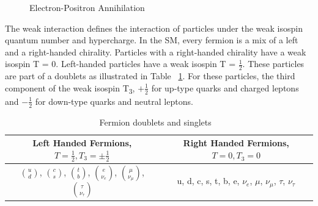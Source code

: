 \begin{figure}[h]
\begin{center}
\caption[Electron-Positron Annihilation]{Electron-Positron Annihilation}
\label{Fey:e-p}
\end{center}
\end{figure}

\indent The weak interaction defines the interaction of particles under the weak isospin quantum number and hypercharge. In the SM, every fermion is a mix of a left and a right-handed chirality. Particles with a right-handed chirality have a weak isospin T = 0. Left-handed particles have a weak isospin T =  ${\frac{1}{2}}$. These particles are part of a doublets as illustrated in Table ~\ref{tab:chiral}. For these particles, the third component of the weak isospin T\textsubscript{3}, ${+\frac{1}{2}}$ for up-type quarks and charged leptons and ${-\frac{1}{2}}$ for down-type quarks and neutral leptons.\newline %

\begin{table}[h]
\begin{center}
\def\arraystretch{1.5}
\begin{tabular}[h]{|c|c|}
\hline
Left Handed Fermions, ${T = \frac{1}{2}, T_{3} = \pm\frac{1}{2}}$ & Right Handed Fermions, ${T = 0, T_{3} = 0}$\\
\hline\hline
${\binom{u}{d}}$, ${\binom{c}{s}}$, ${\binom{t}{b}}$, ${\binom{e}{\nu_{e}}}$, ${\binom{\mu}{\nu_{\mu}}}$, ${\binom{\tau}{\nu_{\tau}}}$ & u, d, c, s, t, b, e, ${\nu_{e}}$, ${\mu}$, ${\nu_{\mu}}$, ${\tau}$, ${\nu_{\tau}}$ \\
\hline
\end{tabular}
\caption[Fermion doublets and singlets]{Fermion doublets and singlets ~\cite{Ian:2018}}
\label{tab:chiral}
\end{center}
\end{table}


